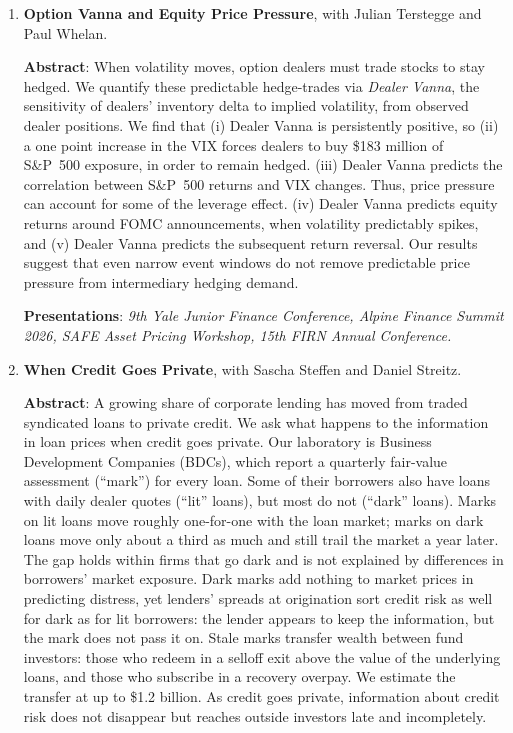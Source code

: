 \documentclass[11pt,a4paper]{article}
\begin{document}
\begin{enumerate}
\textbf{Presentations}: \textit{15th FIRN Annual Conference.}

\item \textbf{Option Vanna and Equity Price Pressure}, with Julian Terstegge and Paul Whelan.

\textbf{Abstract}: When volatility moves, option dealers must trade stocks to stay hedged. We quantify these predictable hedge-trades via \emph{Dealer Vanna}, the sensitivity of dealers' inventory delta to implied volatility, from observed dealer positions. We find that (i) Dealer Vanna is persistently positive, so (ii) a one point increase in the VIX forces dealers to buy \$183 million of S\&P~500 exposure, in order to remain hedged. (iii) Dealer Vanna predicts the correlation between S\&P~500 returns and VIX changes. Thus, price pressure can account for some of the leverage effect. (iv) Dealer Vanna predicts equity returns around FOMC announcements, when volatility predictably spikes, and (v) Dealer Vanna predicts the subsequent return reversal. Our results suggest that even narrow event windows do not remove predictable price pressure from intermediary hedging demand.

\textbf{Presentations}: \textit{9th Yale Junior Finance Conference, Alpine Finance Summit 2026, SAFE Asset Pricing Workshop, 15th FIRN Annual Conference.}

\item \textbf{When Credit Goes Private}, with Sascha Steffen and Daniel Streitz.

\textbf{Abstract}: A growing share of corporate lending has moved from traded syndicated loans to private credit. We ask what happens to the information in loan prices when credit goes private. Our laboratory is Business Development Companies (BDCs), which report a quarterly fair-value assessment (``mark'') for every loan. Some of their borrowers also have loans with daily dealer quotes (``lit'' loans), but most do not (``dark'' loans). Marks on lit loans move roughly one-for-one with the loan market; marks on dark loans move only about a third as much and still trail the market a year later. The gap holds within firms that go dark and is not explained by differences in borrowers' market exposure. Dark marks add nothing to market prices in predicting distress, yet lenders' spreads at origination sort credit risk as well for dark as for lit borrowers: the lender appears to keep the information, but the mark does not pass it on. Stale marks transfer wealth between fund investors: those who redeem in a selloff exit above the value of the underlying loans, and those who subscribe in a recovery overpay. We estimate the transfer at up to \$1.2 billion. As credit goes private, information about credit risk does not disappear but reaches outside investors late and incompletely.
\end{enumerate}
\end{document}
